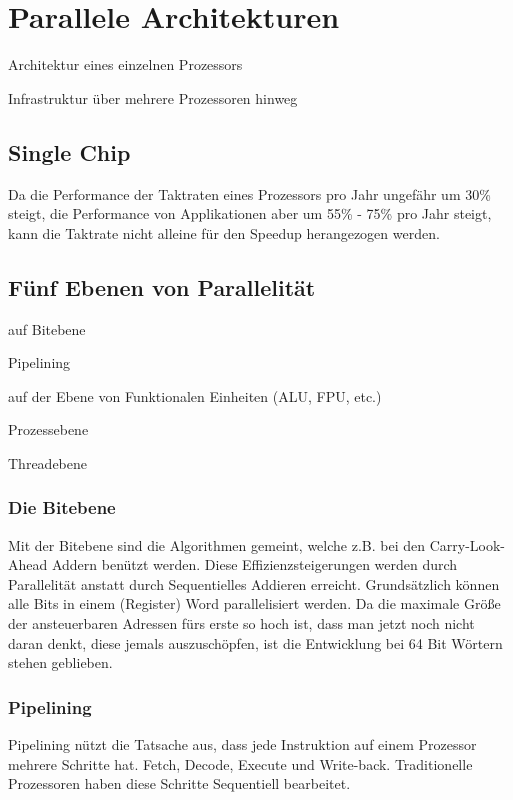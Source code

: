 \section{Parallele Architekturen}

\begin{compactitem}
\item Architektur eines einzelnen Prozessors
\item Infrastruktur über mehrere Prozessoren hinweg
\end{compactitem}

\subsection{Single Chip}

Da die Performance der Taktraten eines Prozessors pro Jahr ungefähr um 30\%
steigt, die Performance von Applikationen aber um 55\% - 75\% pro Jahr steigt,
kann die Taktrate nicht alleine für den Speedup herangezogen werden.

\subsection{Fünf Ebenen von Parallelität}

\begin{compactitem}
\item auf Bitebene
\item Pipelining
\item auf der Ebene von Funktionalen Einheiten (ALU, FPU, etc.)
\item Prozessebene
\item Threadebene
\end{compactitem}

\subsubsection{Die Bitebene}

Mit der Bitebene sind die Algorithmen gemeint, welche z.B. bei den Carry-Look-Ahead
Addern benützt werden. Diese Effizienzsteigerungen werden durch Parallelität anstatt
durch Sequentielles Addieren erreicht. Grundsätzlich können alle Bits in einem 
(Register) Word parallelisiert werden. Da die maximale Größe der ansteuerbaren
Adressen fürs erste so hoch ist, dass man jetzt noch nicht daran denkt, diese
jemals auszuschöpfen, ist die Entwicklung bei 64 Bit Wörtern stehen geblieben.

\subsubsection{Pipelining}

Pipelining nützt die Tatsache aus, dass jede Instruktion auf einem Prozessor
mehrere Schritte hat. Fetch, Decode, Execute und Write-back. Traditionelle
Prozessoren haben diese Schritte Sequentiell bearbeitet. 

